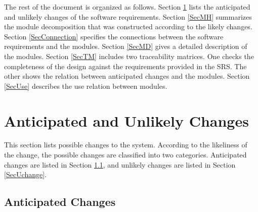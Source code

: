 \documentclass[12pt, titlepage]{article}
\begin{document}
The rest of the document is organized as follows. Section
\ref{SecChange} lists the anticipated and unlikely changes of the software
requirements. Section \ref{SecMH} summarizes the module decomposition that
was constructed according to the likely changes. Section \ref{SecConnection}
specifies the connections between the software requirements and the
modules. Section \ref{SecMD} gives a detailed description of the
modules. Section \ref{SecTM} includes two traceability matrices. One checks
the completeness of the design against the requirements provided in the SRS. The
other shows the relation between anticipated changes and the modules. Section
\ref{SecUse} describes the use relation between modules.

\section{Anticipated and Unlikely Changes} \label{SecChange}

This section lists possible changes to the system. According to the likeliness
of the change, the possible changes are classified into two
categories. Anticipated changes are listed in Section \ref{SecAchange}, and
unlikely changes are listed in Section \ref{SecUchange}.

\subsection{Anticipated Changes} \label{SecAchange}
\end{document}
